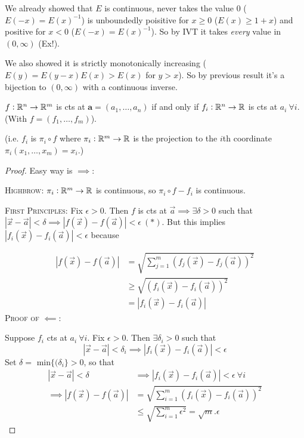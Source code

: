 We already showed that $E$ is continuous, never takes the value $0$ ($E(-x) = E(x)^{-1}$) is unboundedly poisitive for $x \geq 0$ ($E(x) \geq 1 + x$) and positive for $x < 0$ ($E(-x) = E(x)^{-1}$). So by IVT it takes \emph{every} value in $(0,\infty)$ (Ex!). 

We also showed it is strictly monotonically increasing ($E(y) = E(y-x)E(x) > E(x)$ for $y > x$). So by previous result it's a bijection to $(0,\infty)$ with a continuous inverse.\vspace*{5pt}


\begin{theorem}
	$f:\mathbb{R}^n \to \mathbb{R}^m$ is cts at $\mathbf{a} = (a_1,\dots,a_n)$ if and only if $f_i:\mathbb{R}^n \to \mathbb{R}$ is cts at $a_i~\forall i$. (With $f = (f_1,\dots,f_m)$).
\end{theorem}

(i.e. $f_i$ is $\pi_i \circ f$ where $\pi_i: \mathbb{R}^m \to \mathbb{R}$ is the projection to the $i$th coordinate $\pi_i(x_1,\dots,x_m) = x_i$.)

\begin{proof}

Easy way is $\implies$:

\textsc{Highbrow:} $\pi_i: \mathbb{R}^m \to \mathbb{R}$ is continuous, so $\pi_i \circ f - f_i$ is continuous.

\textsc{First Principles:}
	Fix $\epsilon >0.$ Then $f$ is cts at $\vec{a} \implies \exists \delta >0 $ such that $|\vec{x} - \vec{a}| < \delta  \implies |f(\vec{x}) - f(\vec{a})| < \epsilon ~(*)$. But this implies $|f_i(\vec{x}) - f_i(\vec{a})| < \epsilon$ because
	
\[\begin{aligned}
|f(\vec{x}) - f(\vec{a})| &= \sqrt{\sum_{j=1}^m (f_j(\vec{x}) - f_j(\vec{a}))^2}\\
&\geq \sqrt{(f_i(\vec{x}) - f_i(\vec{a}))^2}\\
&= |f_i(\vec{x}) - f_i(\vec{a})| 	
\end{aligned}
\]	
\textsc{Proof of $\impliedby$:}

	Suppose $f_i$ cts at $a_i~\forall i$. Fix $\epsilon > 0$. Then $\exists \delta_i > 0$ such that \[|\vec{x} - \vec{a}| < \delta_i \implies |f_i(\vec{x}) - f_i(\vec{a})| < \epsilon\]
	 Set $\delta =$ min$\{(\delta_i\} >0$, so that 
	 \[\begin{aligned}|\vec{x} - \vec{a}| < \delta &\implies |f_i(\vec{x}) - f_i(\vec{a})| < \epsilon ~\forall i\\
	  \implies |f(\vec{x}) - f(\vec{a})| &= \sqrt{\sum_{i=1}^m (f_i(\vec{x}) - f_i(\vec{a}))^2} \\
	  &\leq \sqrt{\sum_{i=1}^m \epsilon^2} = \sqrt{m}.\epsilon	
\end{aligned}
\]
\end{proof}

